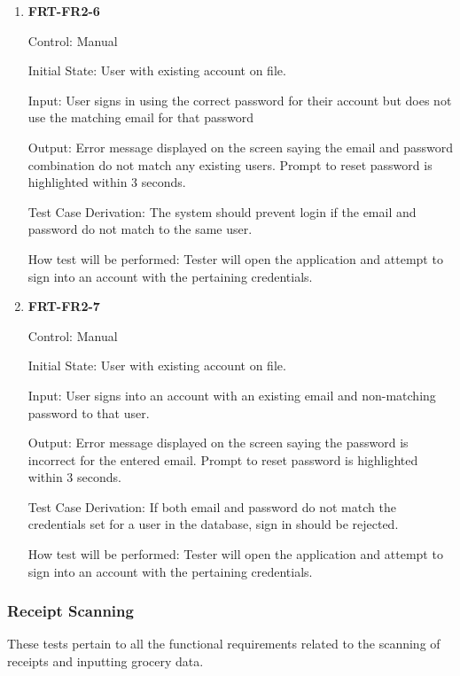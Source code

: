 \documentclass[12pt, titlepage]{article}
\begin{document}
\begin{enumerate}
\item{\textbf{FRT-FR2-6}}

Control: Manual
          
Initial State: User with existing account on file.
          
Input: User signs in using the correct password for their account but does not use the matching email for that password
          
Output: Error message displayed on the screen saying the email and password combination do not match any existing users. Prompt to reset password is highlighted within 3 seconds.

Test Case Derivation: The system should prevent login if the email and password do not match to the same user.
          
How test will be performed: Tester will open the application and attempt to sign into an account with the pertaining credentials.

\item{\textbf{FRT-FR2-7}}

Control: Manual
          
Initial State: User with existing account on file.
          
Input: User signs into an account with an existing email and non-matching password to that user.
          
Output: Error message displayed on the screen saying the password is incorrect for the entered email. Prompt to reset password is highlighted within 3 seconds.

Test Case Derivation: If both email and password do not match the credentials set for a user in the database, sign in
should be rejected.
          
How test will be performed: Tester will open the application and attempt to sign into an account with the pertaining credentials.

\end{enumerate}

\subsubsection{Receipt Scanning}

These tests pertain to all the functional requirements related to the scanning of receipts and inputting grocery data.
\end{document}
